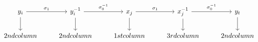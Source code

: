 \documentclass{article}
\begin{document}
\[
\begin{tikzcd}
y_i \arrow[r, "\sigma_1"] \arrow[d] & y_i^{-1} \arrow[r, "\sigma_0^{-1}"] \arrow[d] & x_j \arrow[r, "\sigma_1"] \arrow[d] & x_j^{-1} \arrow[r, "\sigma_0^{-1}"] \arrow[d] & y_t \arrow[d] \\
2nd column & 2nd column & 1st column & 3rd column & 2nd column
\end{tikzcd}
\]
\end{document}
